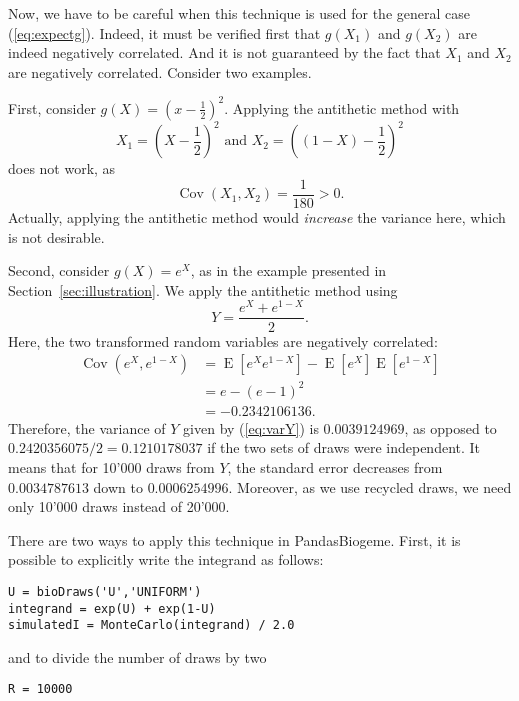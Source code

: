 \documentclass[12pt,a4paper]{article}
\newcommand{\req}[1]{(\ref{#1})}
\newcommand{\expect}{\operatorname{E}}
\newcommand{\cov}{\operatorname{Cov}}
\newcommand{\PBIOGEME}{PandasBiogeme}
\begin{document}
Now, we have to be careful when this technique is used for the general
case \req{eq:expectg}. Indeed, it must be verified first that $g(X_1)$
and $g(X_2)$ are indeed negatively correlated. And it is not
guaranteed by the fact that $X_1$ and $X_2$ are negatively
correlated. Consider two examples.

First, consider $g(X)=\left(x-\frac{1}{2} \right)^2$. Applying the
antithetic method with 
\begin{equation}
X_1 = \left(X-\frac{1}{2}\right)^2 \text{ and } X_2 = \left((1-X)-\frac{1}{2}\right)^2 
\end{equation}
does not work, as 
\begin{equation}
\cov(X_1,X_2) = \frac{1}{180} > 0.
\end{equation}
Actually, applying the antithetic method would \emph{increase} the
variance here, which is not desirable.

Second, consider $g(X)=e^X$, as in the example presented in
Section~\ref{sec:illustration}. We apply the antithetic method using 
\begin{equation}
Y = \frac{e^{X}+e^{1-X}}{2}.
\end{equation}
Here, the two transformed random variables are negatively correlated:
\begin{equation}
\begin{aligned}
\cov(e^X,e^{1-X}) &= \expect[e^X e^{1-X}] -
\expect[e^X]\expect[e^{1-X}] \\
 &= e - (e-1)^2 \\
 &= -0.2342106136.
\end{aligned}
\end{equation}
Therefore, the variance of $Y$ given by \req{eq:varY} is
$0.0039124969$, as opposed to $0.2420356075 / 2 = 0.1210178037$ if the
two sets of draws were independent. It means that for 10'000 draws from
$Y$, the standard error decreases from $0.0034787613$ down to
$0.0006254996$. Moreover, as we use recycled draws, we need only 10'000
draws instead of 20'000. 

There are two ways to apply this technique in \PBIOGEME.
First, it is possible to explicitly write the integrand  as
follows:
\begin{lstlisting}
U = bioDraws('U','UNIFORM')
integrand = exp(U) + exp(1-U) 
simulatedI = MonteCarlo(integrand) / 2.0
\end{lstlisting}
and to divide the number of draws by two
\begin{lstlisting}
R = 10000
\end{lstlisting}
\end{document}
